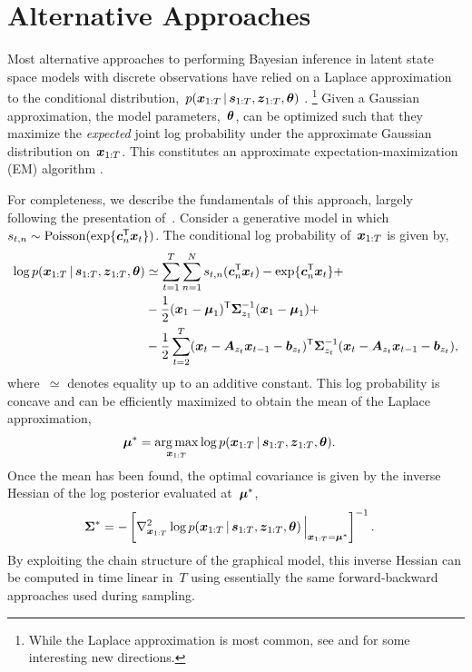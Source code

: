 \section{Alternative Approaches}
Most alternative approaches to performing Bayesian inference in latent
state space models with discrete observations have relied on a Laplace
approximation \citep{tierney1986accurate} to the conditional
distribution,~${p(\boldsymbol{x}_{1:T} \,|\, \boldsymbol{s}_{1:T}, \boldsymbol{z}_{1:T}, \boldsymbol{\theta})}$
\citep{Smith-2003, paninski2010new, macke2011empirical}.
\footnote{While the Laplace approximation is most common, see
  \citet{buesing2012spectral} and \citet{pfau2013robust} for some
  interesting new directions.}  Given a Gaussian approximation, the
model parameters,~$\boldsymbol{\theta}$, can be optimized such that they maximize
the \emph{expected} joint log probability under the approximate
Gaussian distribution on~$\boldsymbol{x}_{1:T}$. This constitutes an approximate
expectation-maximization (EM) algorithm \citep{dempster1977maximum}.

\sloppy
For completeness, we describe the fundamentals of this approach,
largely following the presentation of~\citet{macke2011empirical}.
Consider a generative model in which~${s_{t,n} \sim \mathrm{Poisson}(\exp\{\boldsymbol{c}_n^{\mathsf{T}} \boldsymbol{x}_t\})}$.  The conditional log probability of~$\boldsymbol{x}_{1:T}$ is
given by,
\begin{align*}
  \log p(\boldsymbol{x}_{1:T} \,|\, \boldsymbol{s}_{1:T}, \boldsymbol{z}_{1:T}, \boldsymbol{\theta})
  &\simeq \sum_{t=1}^T \sum_{n=1}^N s_{t,n} (\boldsymbol{c}_{n}^{\mathsf{T}} \boldsymbol{x}_{t}) - \exp\{\boldsymbol{c}_n^{\mathsf{T}}\boldsymbol{x}_{t}\} + \\
  &-\frac{1}{2} (\boldsymbol{x}_1 - \boldsymbol{\mu}_1)^{\mathsf{T}} \boldsymbol{\Sigma}_{z_1}^{-1} (\boldsymbol{x}_1 - \boldsymbol{\mu}_1) + \\
  &-\frac{1}{2} \sum_{t=2}^T (\boldsymbol{x}_t - \boldsymbol{A}_{z_t} \boldsymbol{x}_{t-1} - \boldsymbol{b}_{z_t})^{\mathsf{T}}
  \boldsymbol{\Sigma}_{z_t}^{-1} (\boldsymbol{x}_t - \boldsymbol{A}_{z_t} \boldsymbol{x}_{t-1} - \boldsymbol{b}_{z_t}),
\end{align*}
where~$\simeq$ denotes equality up to an additive constant.
This log probability is concave and can be efficiently maximized to
obtain the mean of the Laplace approximation,
\begin{align*}
  \bmu^* &= \argmax_{\bx_{1:T}}
  \log p(\bx_{1:T} \given \bs_{1:T}, \bz_{1:T}, \btheta).
\end{align*}
Once the mean has been found, the optimal covariance is given by
the inverse Hessian of the log posterior evaluated at~$\boldsymbol{\mu}^*$,
\begin{align*}
  \boldsymbol{\Sigma}^* &= - \left[ \nabla^2_{\boldsymbol{x}_{1:T}}
      \log p(\boldsymbol{x}_{1:T} \,|\, \boldsymbol{s}_{1:T}, \boldsymbol{z}_{1:T}, \boldsymbol{\theta}) \, \Big|_{\boldsymbol{x}_{1:T}=\boldsymbol{\mu}^*} \right]^{-1}.
\end{align*}
By exploiting the chain structure of the graphical model, this
inverse Hessian can be computed in time linear in~$T$ using essentially
the same forward-backward approaches used during sampling.

